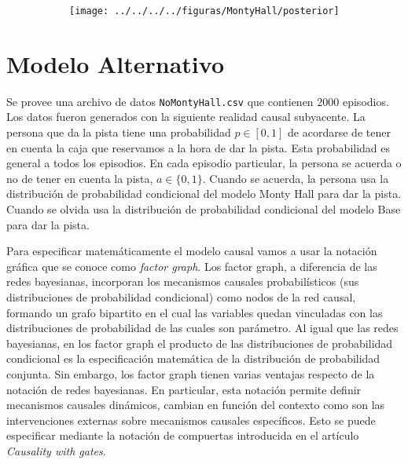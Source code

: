 \documentclass[a4paper,10pt]{article}
\begin{document}
 \begin{figure}[H] \centering
\begin{subfigure}[t]{0.48\textwidth}
\texttt{[image: ../../../../figuras/MontyHall/posterior]}
\end{subfigure}
\end{figure}

\section{Modelo Alternativo}

Se provee una archivo de datos \texttt{NoMontyHall.csv} que contienen 2000 episodios.
%
Los datos fueron generados con la siguiente realidad causal subyacente.
%
La persona que da la pista tiene una probabilidad $p \in [0,1]$ de acordarse de tener en cuenta la caja que reservamos a la hora de dar la pista.
%
Esta probabilidad es general a todos los episodios.
%
En cada episodio particular, la persona se acuerda o no de tener en cuenta la pista, $a \in \{0,1\}$.
%
Cuando se acuerda, la persona usa la distribución de probabilidad condicional del modelo Monty Hall para dar la pista.
%
Cuando se olvida usa la distribución de probabilidad condicional del modelo Base para dar la pista.


Para especificar matemáticamente el modelo causal vamos a usar la notación gráfica que se conoce como \emph{factor graph}.
%
Los factor graph, a diferencia de las redes bayesianas, incorporan los mecanismos causales probabilísticos (sus distribuciones de probabilidad condicional) como nodos de la red causal, formando un grafo bipartito en el cual las variables quedan vinculadas con las distribuciones de probabilidad de las cuales son parámetro.
%
Al igual que las redes bayesianas, en los factor graph el producto de las distribuciones de probabilidad condicional es la especificación matemática de la distribución de probabilidad conjunta.
%
Sin embargo, los factor graph tienen varias ventajas respecto de la notación de redes bayesianas.
%
En particular, esta notación permite definir mecanismos causales dinámicos, cambian en función del contexto como son las intervenciones externas sobre mecanismos causales específicos.
%
Esto se puede especificar mediante la notación de compuertas introducida en el artículo \emph{Causality with gates}.

\end{document}

